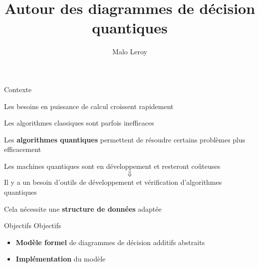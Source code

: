 \documentclass[french, 12pt]{beamer}
\title{Autour des diagrammes de décision quantiques}
\author{Malo Leroy}
\institute{Parcours recherche -- CentraleSupélec}
\begin{document}
\begin{frame}
    \titlepage
\end{frame}

\begin{frame}{Contexte}

\begin{center}
Les besoins en puissance de calcul croissent rapidement


Les algorithmes classiques sont parfois inefficaces

\pause
Les \textbf{algorithmes quantiques} permettent de résoudre certains problèmes plus efficacement
\end{center}
\end{frame}

\begin{frame}
Les machines quantiques sont en développement et resteront coûteuses
$$\Downarrow$$
Il y a un besoin d'outils de développement et vérification d'algorithmes quantiques
\pause

\vspace{1em}
Cela nécessite une \textbf{structure de données} adaptée
\end{frame}



\begin{frame}{Objectifs}
    Objectifs
    \begin{itemize}
        \item \textbf{Modèle formel} de diagrammes de décision additifs abstraits
        \item \textbf{Implémentation} du modèle
    \end{itemize}
\end{frame}
\end{document}
